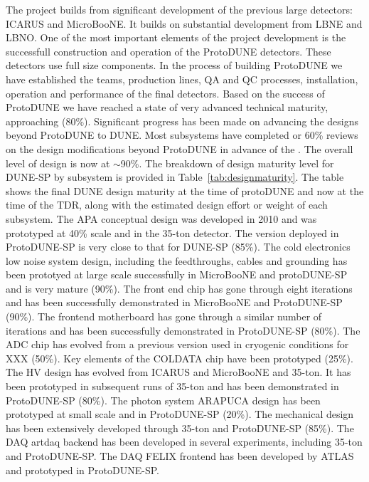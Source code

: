 The  project builds from significant development of the
previous large  detectors: ICARUS and MicroBooNE. It
builds on substantial development from LBNE and LBNO. One of the most
important elements of the project development is the successfull
construction and operation of the ProtoDUNE detectors. These detectors
use full size  components. In the process of building
ProtoDUNE we have established the teams, production lines, QA and QC
processes, installation, operation and performance of the final
 detectors. Based on the success of ProtoDUNE we have
reached a state of very advanced technical maturity, approaching
(80\%). Significant progress has been made on advancing the designs
beyond ProtoDUNE to DUNE. Most subsystems have completed 
or 60\% reviews on the design modifications beyond ProtoDUNE in
advance of the . The overall level of design is now at
$\sim$90\%. The breakdown of design maturity level for DUNE-SP by
subsystem is provided in Table~\ref{tab:designmaturity}. The table
shows the final DUNE design maturity at the time of protoDUNE and now
at the time of the TDR, along with the estimated design effort or
weight of each subsystem. The APA conceptual design was developed in
2010 and was prototyped at 40\% scale and in the 35-ton detector. The
version deployed in ProtoDUNE-SP is very close to that for DUNE-SP
(85\%). The cold electronics low noise system design, including the
feedthroughs, cables and grounding has been prototyed at large scale
successfully in MicroBooNE and protoDUNE-SP and is very mature
(90\%). The front end chip has gone through eight iterations and has
been successfully demonstrated in MicroBooNE and ProtoDUNE-SP
(90\%). The frontend motherboard has gone through a similar number of
iterations and has been successfully demonstrated in ProtoDUNE-SP
(80\%). The ADC chip has evolved from a previous version used in
cryogenic conditions for XXX (50\%). Key elements of the COLDATA chip
have been prototyped (25\%). The HV design has evolved from ICARUS and
MicroBooNE and 35-ton. It has been prototyped in subsequent runs of
35-ton and has been demonstrated in ProtoDUNE-SP (80\%). The photon
system ARAPUCA design has been prototyped at small scale and in
ProtoDUNE-SP (20\%). The mechanical design has been extensively
developed through 35-ton and ProtoDUNE-SP (85\%). The DAQ artdaq
backend has been developed in several experiments, including 35-ton
and ProtoDUNE-SP. The DAQ FELIX frontend has been developed by ATLAS
and prototyped in ProtoDUNE-SP.
